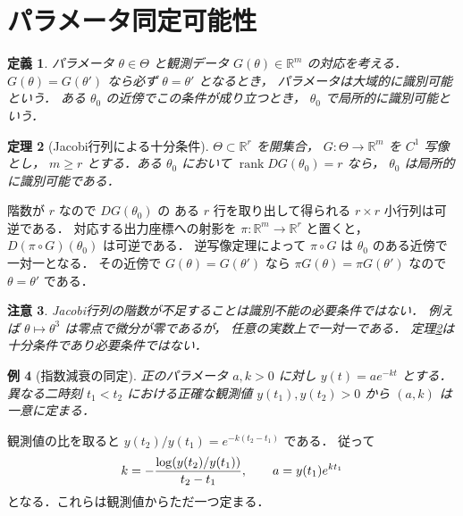 \documentclass[a5paper,10pt,onecolumn]{jsarticle}
\makeatletter
\theoremstyle{mathnotetheorem}
\newtheorem{theorem}{定理}[section]
\newtheorem{definition}[theorem]{定義}
\newtheorem{example}[theorem]{例}
\newtheorem{remark}[theorem]{注意}
\renewcommand{\proofname}{証明}
\renewenvironment{proof}[1][\proofname]{%
  \par\pushQED{\qed}\normalfont\topsep4\p@\@plus2\p@\relax
  \trivlist\item[\hskip\labelsep\bfseries #1]\ignorespaces
}{\popQED\endtrivlist\@endpefalse}
\makeatother
\begin{document}
\section{パラメータ同定可能性}
\begin{definition}
パラメータ $\theta\in\Theta$ と観測データ
$G(\theta)\in\mathbb R^m$ の対応を考える．
$G(\theta)=G(\theta')$ なら必ず $\theta=\theta'$ となるとき，
パラメータは大域的に識別可能という．
ある $\theta_0$ の近傍でこの条件が成り立つとき，
$\theta_0$ で局所的に識別可能という．
\end{definition}
\begin{theorem}[Jacobi行列による十分条件]\label{thm:ident}
$\Theta\subset\mathbb R^r$ を開集合，
$G:\Theta\to\mathbb R^m$ を $C^1$ 写像とし，
$m\ge r$ とする．ある $\theta_0$ において
$\operatorname{rank}DG(\theta_0)=r$ なら，
$\theta_0$ は局所的に識別可能である．
\end{theorem}
\begin{proof}
階数が $r$ なので $DG(\theta_0)$ の
ある $r$ 行を取り出して得られる $r\times r$ 小行列は可逆である．
対応する出力座標への射影を
$\pi:\mathbb R^m\to\mathbb R^r$ と置くと，
$D(\pi\circ G)(\theta_0)$ は可逆である．
逆写像定理によって $\pi\circ G$ は
$\theta_0$ のある近傍で一対一となる．
その近傍で $G(\theta)=G(\theta')$ なら
$\pi G(\theta)=\pi G(\theta')$ なので
$\theta=\theta'$ である．
\end{proof}
\begin{remark}
Jacobi行列の階数が不足することは識別不能の必要条件ではない．
例えば $\theta\mapsto\theta^3$ は零点で微分が零であるが，
任意の実数上で一対一である．
定理\ref{thm:ident}は十分条件であり必要条件ではない．
\end{remark}
\begin{example}[指数減衰の同定]
正のパラメータ $a,k>0$ に対し
$y(t)=a e^{-kt}$ とする．異なる二時刻
$t_1<t_2$ における正確な観測値
$y(t_1),y(t_2)>0$ から $(a,k)$ は一意に定まる．
\end{example}
\begin{proof}
観測値の比を取ると
$y(t_2)/y(t_1)=e^{-k(t_2-t_1)}$ である．
従って
\[
 k=-{\log(y(t_2)/y(t_1))\over t_2-t_1},
 \qquad a=y(t_1)e^{kt_1}
\]
となる．これらは観測値からただ一つ定まる．
\end{proof}
\end{document}
